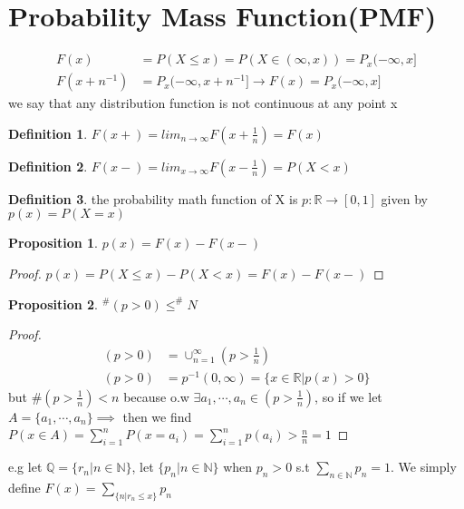 \documentclass{article}
\theoremstyle{definition}
\newtheorem{definition}{Definition}[section]
\theoremstyle{thrm}
\theoremstyle{lma}
\theoremstyle{ppst}
\newtheorem{ppst}{Proposition}[section]
\theoremstyle{crlr}
\begin{document}
\section{Probability Mass Function(PMF)}
\begin{align*}
	F(x)&=P(X\leq x) = P(X\in(\infty,x)) = P_x(-\infty,x]\\
	F(x+n^{-1}) &= P_x(-\infty,x+n^{-1}] \to F(x)= P_x(-\infty,x]
\end{align*}
we say that any distribution function is not continuous at any point x
\begin{definition}
	$F(x+)=lim_{n\to \infty}F(x+\frac{1}{n}) = F(x)$
\end{definition}
\begin{definition}
	$F(x-) = lim_{x\to \infty}F(x-\frac{1}{n}) = P(X<x)$
\end{definition}
\begin{definition}
	the probability math function of X is $p:\mathbb{R}\to [0,1]$ given by $p(x) = P(X=x)$
\end{definition}
\begin{ppst}
	$p(x) = F(x)-F(x-)$
\end{ppst}
\begin{proof}
	$p(x) = P(X\leq x)-P(X<x) = F(x)-F(x-)$
\end{proof}
\begin{ppst}
	$^{\#}(p>0)\leq ^{\#}N$
\end{ppst}
\begin{proof}
	\begin{align*}
		(p>0) &= \cup_{n=1}^\infty (p>\frac{1}{n})\\
		(p>0) &= p^{-1}(0,\infty) = \{x\in \mathbb{R}|p(x)>0\}
	\end{align*}
	but $\#(p>\frac{1}{n})<n$ because o.w $\exists a_1,\cdots, a_n \in (p>\frac{1}{n})$, so if we let $A = \{a_1,\cdots, a_n\}\implies$ then we find $P(x\in A) = \sum_{i=1}^nP(x=a_i) = \sum_{i=1}^np(a_i)>\frac{n}{n}=1$ 
\end{proof}
e.g let $\mathbb{Q} = \{r_n| n\in\mathbb{N}\}$, let $\{p_n| n \in \mathbb{N}\}$ when $p_n>0$ s.t $\sum_{n\in \mathbb{N}}p_n=1$. We simply define $F(x) = \sum_{\{n|r_n\leq x\}}p_n$
\end{document}
